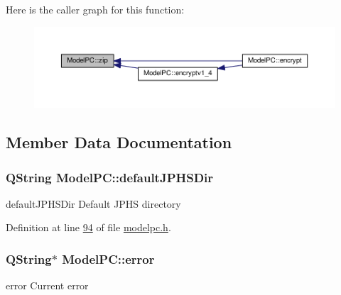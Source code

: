 Here is the caller graph for this function\-:
\nopagebreak
\begin{figure}[H]
\begin{center}
\leavevmode
\includegraphics[width=350pt]{class_model_p_c_afebbbfa4b07deba4f68fc6dfb50f353f_icgraph}
\end{center}
\end{figure}




\subsection{Member Data Documentation}
\hypertarget{class_model_p_c_abd038306f14f22fb885a1697c96d6335}{
\subsubsection[{default\-J\-P\-H\-S\-Dir}]{\setlength{\rightskip}{0pt plus 5cm}Q\-String Model\-P\-C\-::default\-J\-P\-H\-S\-Dir}}\label{class_model_p_c_abd038306f14f22fb885a1697c96d6335}


default\-J\-P\-H\-S\-Dir Default J\-P\-H\-S directory 



Definition at line \hyperlink{modelpc_8h_source_l00094}{94} of file \hyperlink{modelpc_8h_source}{modelpc.\-h}.

\hypertarget{class_model_p_c_a4e5a9c0ca1f06fe5bc478b6bf248c37c}{
\subsubsection[{error}]{\setlength{\rightskip}{0pt plus 5cm}Q\-String$\ast$ Model\-P\-C\-::error\hspace{0.3cm}{\ttfamily [protected]}}}\label{class_model_p_c_a4e5a9c0ca1f06fe5bc478b6bf248c37c}


error Current error 




